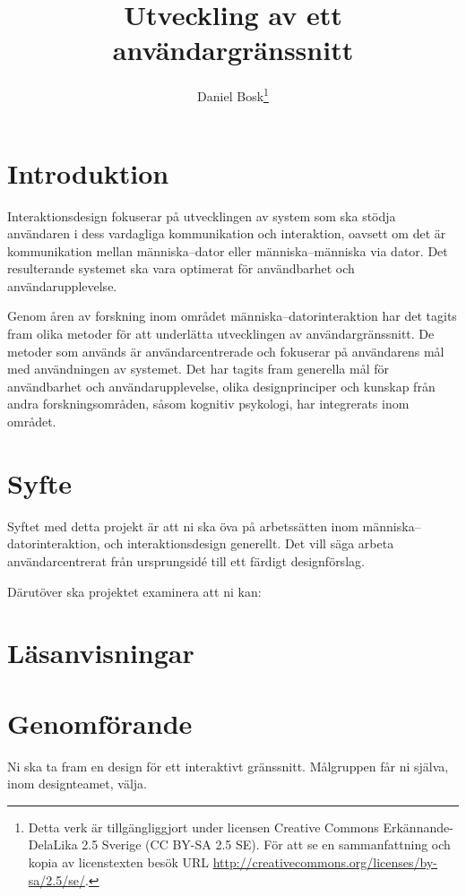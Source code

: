 \documentclass[a4paper,logo,nocourse]{miunasgn}
\title{Utveckling av ett användargränssnitt}
\author{Daniel Bosk\footnote{%
  Detta verk är tillgängliggjort under licensen Creative Commons 
  Erkännande-DelaLika 2.5 Sverige (CC BY-SA 2.5 SE).
  För att se en sammanfattning och kopia av licenstexten besök URL 
  \url{http://creativecommons.org/licenses/by-sa/2.5/se/}.
}}
\date{\svnId}
\begin{document}
\maketitle
\thispagestyle{foot}
\tableofcontents


\section{Introduktion}
\label{sec:Introduktion}
Interaktionsdesign fokuserar på utvecklingen av system som ska stödja 
användaren i dess vardagliga kommunikation och interaktion, oavsett om det är 
kommunikation mellan människa--dator eller människa--människa via dator.
Det resulterande systemet ska vara optimerat för användbarhet och 
användarupplevelse.

Genom åren av forskning inom området människa--datorinteraktion har det tagits 
fram olika metoder för att underlätta utvecklingen av användargränssnitt.
De metoder som används är användarcentrerade och fokuserar på användarens mål 
med användningen av systemet.
Det har tagits fram generella mål för användbarhet och användarupplevelse, 
olika designprinciper och kunskap från andra forskningsområden, såsom kognitiv 
psykologi, har integrerats inom området.


\section{Syfte}
\label{sec:Syfte}
Syftet med detta projekt är att ni ska öva på arbetssätten inom 
människa--datorinteraktion, och interaktionsdesign generellt.
Det vill säga arbeta användarcentrerat från ursprungsidé till ett färdigt 
designförslag.

Därutöver ska projektet examinera att ni kan:
\begin{itemize}
    
\end{itemize}


\section{Läsanvisningar}
\label{sec:Lasanvisningar}



\section{Genomförande}
\label{sec:Genomforande}
Ni ska ta fram en design för ett interaktivt gränssnitt.
Målgruppen får ni själva, inom designteamet, välja.
\end{document}

